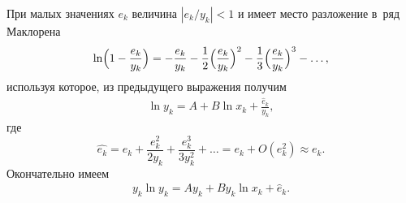 При малых значениях $e_k$ величина $\left| {e_k}/{y_k} \right| < 1$ и имеет место разложение в~ряд Маклорена 
\begin{gather*}
\ln \Bigl(1-\frac{e_k}{y_k}\Bigr)=-\frac{e_k}{y_k} - 
\frac{1}{2}\Bigl(\frac{e_k}{y_k} \Bigr)^2 - 
\frac{1}{3}\Bigl(\frac{e_k}{y_k} \Bigr)^3 - \dots ,
\end{gather*}
используя которое, из предыдущего выражения получим
\begin{gather*}
	\ln y_k = A + B \ln x_k + \frac{\hat{e}_k}{y_k},
\end{gather*}
где 
$$\hat{e_k}=e_k+\frac{e_k^2}{2y_k} + \frac{e_k^3}{3y_k^2} + \dots = e_k + O(e^2_k) \approx e_k.$$ 
Окончательно имеем
\begin{gather} \label{eq:13}
	y_k \ln y_k = A y_k + B y_k \ln x_k + \hat{e}_k.
\end{gather}

